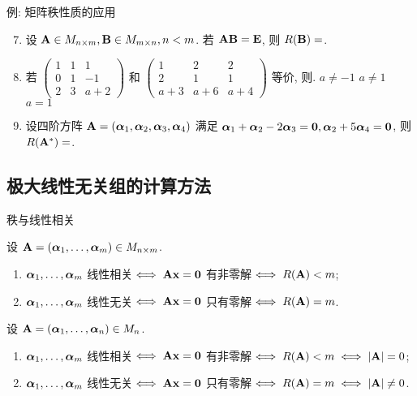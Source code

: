 \begin{frame}{例: 矩阵秩性质的应用}
	\onslide<+->
	\begin{exercise}
		\begin{enumerate}
			\setcounter{enumi}{6}
			\item 设 ${\mathbf{A}}\in M_{n\times m},{\mathbf{B}}\in M_{m\times n},n<m$. 若 ${\mathbf{A}}{\mathbf{B}}={\mathbf{E}}$, 则 $R({\mathbf{B}})=$.
			\item 若 $\begin{pmatrix}
				1&1&1\\0&1&-1\\2&3&a+2
			\end{pmatrix}$ 和 $\begin{pmatrix}
				1&2&2\\2&1&1\\a+3&a+6&a+4
			\end{pmatrix}$ 等价, 则.
			{$a\neq-1$}%
			{$a\neq 1$}%
			{$a=1$}
			\item 设四阶方阵 ${\mathbf{A}}=({\boldsymbol{\alpha}}_1,{\boldsymbol{\alpha}}_2,{\boldsymbol{\alpha}}_3,{\boldsymbol{\alpha}}_4)$ 满足 ${\boldsymbol{\alpha}}_1+{\boldsymbol{\alpha}}_2-2{\boldsymbol{\alpha}}_3={\bf0},{\boldsymbol{\alpha}}_2+5{\boldsymbol{\alpha}}_4={\bf0}$, 则 $R({\mathbf{A}}^*)=$.
		\end{enumerate}
	\end{exercise}
\end{frame}


\subsection{极大线性无关组的计算方法}

\begin{frame}{秩与线性相关}
	\onslide<+->
	\begin{proposition}
		设 ${\mathbf{A}}=({\boldsymbol{\alpha}}_1,\dots,{\boldsymbol{\alpha}}_m)\in M_{n\times m}$.
		\begin{enumerate}
			\item ${\boldsymbol{\alpha}}_1,\dots,{\boldsymbol{\alpha}}_m$ 线性相关$\iff {\mathbf{A}}{\mathbf{x}}={\bf0}$ 有非零解$\iff R({\mathbf{A}})<m$;
			\item ${\boldsymbol{\alpha}}_1,\dots,{\boldsymbol{\alpha}}_m$ 线性无关$\iff {\mathbf{A}}{\mathbf{x}}={\bf0}$ 只有零解$\iff R({\mathbf{A}})=m$.
		\end{enumerate}
	\end{proposition}
	\onslide<+->
	\begin{corollary}
		设 ${\mathbf{A}}=({\boldsymbol{\alpha}}_1,\dots,{\boldsymbol{\alpha}}_n)\in M_n$.
		\begin{enumerate}
			\item ${\boldsymbol{\alpha}}_1,\dots,{\boldsymbol{\alpha}}_m$ 线性相关$\iff {\mathbf{A}}{\mathbf{x}}={\bf0}$ 有非零解$\iff R({\mathbf{A}})<m\iff |{\mathbf{A}}|=0$;
			\item ${\boldsymbol{\alpha}}_1,\dots,{\boldsymbol{\alpha}}_m$ 线性无关$\iff {\mathbf{A}}{\mathbf{x}}={\bf0}$ 只有零解$\iff R({\mathbf{A}})=m\iff |{\mathbf{A}}|\neq0$.
		\end{enumerate}
	\end{corollary}
\end{frame}


